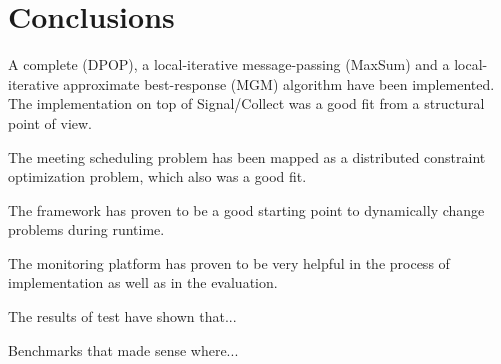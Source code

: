 \chapter{Conclusions}
\label{c:conclusions} 

A complete (DPOP), a local-iterative message-passing (MaxSum) and a local-iterative approximate best-response (MGM) algorithm have been implemented. The implementation on top of Signal/Collect was a good fit from a structural point of view.

The meeting scheduling problem has been mapped as a distributed constraint optimization problem, which also was a good fit.

The framework has proven to be a good starting point to dynamically change problems during runtime.

The monitoring platform has proven to be very helpful in the process of implementation as well as in the evaluation.

The results of test have shown that...

Benchmarks that made sense where...

